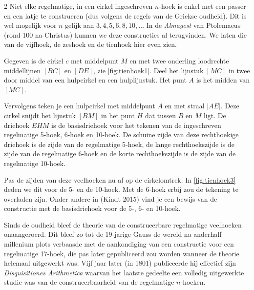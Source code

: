 \begin{multicols}{2}
	Niet elke regelmatige, in een cirkel ingeschreven $n$-hoek is enkel met een passer en een latje te construeren (dus volgens de regels van de Griekse oudheid). Dit is wel mogelijk voor \(n\) gelijk aan \(3, 4, 5, 6, 8, 10, \ldots\) In de \emph{Almagest} van Ptolemaeus (rond 100 na Christus) kunnen we deze constructies al terugvinden. We laten die van de vijfhoek, de zeshoek en de tienhoek hier even zien.
	
	Gegeven is de cirkel $c$ met middelpunt $M$ en met twee onderling loodrechte middellijnen $[BC]$ en $[DE]$, zie \autoref{fig:tienhoek1}. Deel het lijnstuk $[MC]$ in twee door middel van een hulpcirkel en een hulplijnstuk. Het punt $A$ is het midden van $[MC]$.
	
	
	Vervolgens teken je een hulpcirkel met middelpunt $A$ en met straal $|AE|$. Deze cirkel snijdt het lijnstuk $[BM]$ in het punt $H$ dat tussen $B$ en $M$ ligt. De driehoek $EHM$ is de basisdriehoek voor het tekenen van de ingeschreven regelmatige 5-hoek, 6-hoek en 10-hoek. De schuine zijde van deze rechthoekige driehoek is de zijde van de regelmatige 5-hoek, de lange rechthoekszijde is de zijde van de regelmatige 6-hoek en de korte rechthoekszijde is de zijde van de regelmatige 10-hoek.
	
	
	Pas de zijden van deze veelhoeken nu af op de cirkelomtrek. In \autoref{fig:tienhoek3} deden we dit voor de 5- en de 10-hoek. Met de 6-hoek erbij zou de tekening te overladen zijn. Onder andere in (Kindt 2015) vind je een bewijs van de constructie met de basisdriehoek voor de 5-, 6- en 10-hoek.
	
	
	Sinds de oudheid bleef de theorie van de construeerbare regelmatige veelhoeken onaangeroerd. Dit bleef zo tot de 19-jarige Gauss de wereld na anderhalf millenium plots verbaasde met de aankondiging van een constructie voor een regelmatige 17-hoek, die pas later gepubliceerd zou worden wanneer de theorie helemaal uitgewerkt was. Vijf jaar later (in 1801) publiceerde hij effectief zijn \emph{Disquisitiones Arithmetica} waarvan het laatste gedeelte een volledig uitgewerkte studie was van de construeerbaarheid van de regelmatige $n$-hoeken.
	

\end{multicols}
